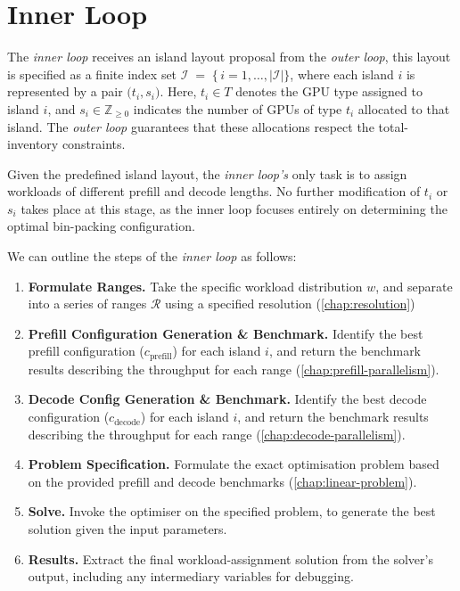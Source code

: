 \clearpage
\section{Inner Loop}
\label{chap:inner-loop}

The \textit{inner loop} receives an island layout proposal from the \textit{outer loop}, this layout is specified as a finite index set \(\mathcal{I} \;=\; \{\,i = 1,\dots,|\mathcal{I}|\}\), where each island \(i\) is represented by a pair \(\bigl(t_{i},s_{i}\bigr)\).  
Here, \(t_{i}\in T\) denotes the GPU type assigned to island \(i\), and \(s_{i}\in \mathbb{Z}_{\ge 0}\) indicates the number of GPUs of type \(t_{i}\) allocated to that island.
The \textit{outer loop} guarantees that these allocations respect the total-inventory constraints.

Given the predefined island layout, the \textit{inner loop's} only task is to assign workloads of different prefill and decode lengths.
No further modification of \(t_{i}\) or \(s_{i}\) takes place at this stage, as the inner loop focuses entirely on determining the optimal bin-packing configuration.

We can outline the steps of the \textit{inner loop} as follows: 

\begin{enumerate}
    \item \textbf{Formulate Ranges.}  
    Take the specific workload distribution $w$, and separate into a series of ranges $\mathcal{R}$ using a specified resolution (\autoref{chap:resolution})
    
    \item \textbf{Prefill Configuration Generation \& Benchmark.}  
    Identify the best prefill configuration ($c_{\mathrm{prefill}}$) for each island \(i\), and return the benchmark results describing the throughput for each range (\autoref{chap:prefill-parallelism}).
    
    \item \textbf{Decode Config Generation \& Benchmark.}  
    Identify the best decode configuration ($c_{\mathrm{decode}}$) for each island \(i\), and return the benchmark results describing the throughput for each range (\autoref{chap:decode-parallelism}).
    
    \item \textbf{Problem Specification.}  
    Formulate the exact optimisation problem based on the provided prefill and decode benchmarks (\autoref{chap:linear-problem}).
    
    \item \textbf{Solve.}  
    Invoke the optimiser on the specified problem, to generate the best solution given the input parameters.
    
    \item \textbf{Results.}  
    Extract the final workload-assignment solution from the solver's output, including any intermediary variables for debugging.
\end{enumerate}

